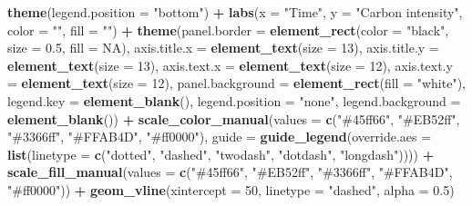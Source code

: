 \documentclass[
]{article}
\newenvironment{Shaded}{\begin{snugshade}}{\end{snugshade}}
\newcommand{\AttributeTok}[1]{\textcolor[rgb]{0.13,0.29,0.53}{#1}}
\newcommand{\ConstantTok}[1]{\textcolor[rgb]{0.56,0.35,0.01}{#1}}
\newcommand{\DecValTok}[1]{\textcolor[rgb]{0.00,0.00,0.81}{#1}}
\newcommand{\FloatTok}[1]{\textcolor[rgb]{0.00,0.00,0.81}{#1}}
\newcommand{\FunctionTok}[1]{\textcolor[rgb]{0.13,0.29,0.53}{\textbf{#1}}}
\newcommand{\NormalTok}[1]{#1}
\newcommand{\SpecialCharTok}[1]{\textcolor[rgb]{0.81,0.36,0.00}{\textbf{#1}}}
\newcommand{\StringTok}[1]{\textcolor[rgb]{0.31,0.60,0.02}{#1}}
\begin{document}
\begin{Shaded}
\begin{Highlighting}[]
  \FunctionTok{theme}\NormalTok{(}\AttributeTok{legend.position =} \StringTok{"bottom"}\NormalTok{) }\SpecialCharTok{+}
  \FunctionTok{labs}\NormalTok{(}\AttributeTok{x =} \StringTok{"Time"}\NormalTok{, }\AttributeTok{y =} \StringTok{"Carbon intensity"}\NormalTok{, }\AttributeTok{color =} \StringTok{""}\NormalTok{, }\AttributeTok{fill =} \StringTok{""}\NormalTok{) }\SpecialCharTok{+}
  \FunctionTok{theme}\NormalTok{(}\AttributeTok{panel.border =} \FunctionTok{element\_rect}\NormalTok{(}\AttributeTok{color =} \StringTok{"black"}\NormalTok{, }\AttributeTok{size =} \FloatTok{0.5}\NormalTok{, }\AttributeTok{fill =} \ConstantTok{NA}\NormalTok{),}
        \AttributeTok{axis.title.x =} \FunctionTok{element\_text}\NormalTok{(}\AttributeTok{size =} \DecValTok{13}\NormalTok{),}
        \AttributeTok{axis.title.y =} \FunctionTok{element\_text}\NormalTok{(}\AttributeTok{size =} \DecValTok{13}\NormalTok{),}
        \AttributeTok{axis.text.x =} \FunctionTok{element\_text}\NormalTok{(}\AttributeTok{size =} \DecValTok{12}\NormalTok{),}
        \AttributeTok{axis.text.y =} \FunctionTok{element\_text}\NormalTok{(}\AttributeTok{size =} \DecValTok{12}\NormalTok{),}
        \AttributeTok{panel.background =} \FunctionTok{element\_rect}\NormalTok{(}\AttributeTok{fill =} \StringTok{"white"}\NormalTok{),}
        \AttributeTok{legend.key =} \FunctionTok{element\_blank}\NormalTok{(),}
         \AttributeTok{legend.position =} \StringTok{"none"}\NormalTok{,}
        \AttributeTok{legend.background =} \FunctionTok{element\_blank}\NormalTok{()) }\SpecialCharTok{+}
  \FunctionTok{scale\_color\_manual}\NormalTok{(}\AttributeTok{values =} \FunctionTok{c}\NormalTok{(}\StringTok{"\#45ff66"}\NormalTok{, }\StringTok{"\#EB52ff"}\NormalTok{, }\StringTok{"\#3366ff"}\NormalTok{, }\StringTok{"\#FFAB4D"}\NormalTok{, }\StringTok{"\#ff0000"}\NormalTok{),}
                     \AttributeTok{guide =} \FunctionTok{guide\_legend}\NormalTok{(}\AttributeTok{override.aes =} \FunctionTok{list}\NormalTok{(}\AttributeTok{linetype =} \FunctionTok{c}\NormalTok{(}\StringTok{"dotted"}\NormalTok{, }\StringTok{"dashed"}\NormalTok{, }\StringTok{"twodash"}\NormalTok{, }\StringTok{"dotdash"}\NormalTok{, }\StringTok{"longdash"}\NormalTok{)))) }\SpecialCharTok{+}
  \FunctionTok{scale\_fill\_manual}\NormalTok{(}\AttributeTok{values =} \FunctionTok{c}\NormalTok{(}\StringTok{"\#45ff66"}\NormalTok{, }\StringTok{"\#EB52ff"}\NormalTok{, }\StringTok{"\#3366ff"}\NormalTok{, }\StringTok{"\#FFAB4D"}\NormalTok{, }\StringTok{"\#ff0000"}\NormalTok{)) }\SpecialCharTok{+}
  \FunctionTok{geom\_vline}\NormalTok{(}\AttributeTok{xintercept =} \DecValTok{50}\NormalTok{, }\AttributeTok{linetype =} \StringTok{"dashed"}\NormalTok{, }\AttributeTok{alpha =} \FloatTok{0.5}\NormalTok{)}
\end{Highlighting}
\end{Shaded}
\end{document}
